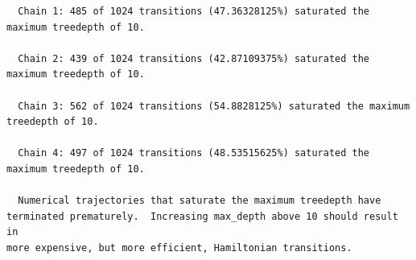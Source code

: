 \documentclass[
  letterpaper,
  DIV=11,
  numbers=noendperiod]{scrartcl}
\newenvironment{Shaded}{\begin{snugshade}}{\end{snugshade}}
\newcommand{\AttributeTok}[1]{\textcolor[rgb]{0.40,0.45,0.13}{#1}}
\newcommand{\ConstantTok}[1]{\textcolor[rgb]{0.56,0.35,0.01}{#1}}
\newcommand{\FunctionTok}[1]{\textcolor[rgb]{0.28,0.35,0.67}{#1}}
\newcommand{\NormalTok}[1]{\textcolor[rgb]{0.00,0.23,0.31}{#1}}
\newcommand{\OtherTok}[1]{\textcolor[rgb]{0.00,0.23,0.31}{#1}}
\newcommand{\SpecialCharTok}[1]{\textcolor[rgb]{0.37,0.37,0.37}{#1}}
\newcommand{\StringTok}[1]{\textcolor[rgb]{0.13,0.47,0.30}{#1}}
\begin{document}
\begin{verbatim}
  Chain 1: 485 of 1024 transitions (47.36328125%) saturated the maximum treedepth of 10.

  Chain 2: 439 of 1024 transitions (42.87109375%) saturated the maximum treedepth of 10.

  Chain 3: 562 of 1024 transitions (54.8828125%) saturated the maximum treedepth of 10.

  Chain 4: 497 of 1024 transitions (48.53515625%) saturated the maximum treedepth of 10.

  Numerical trajectories that saturate the maximum treedepth have
terminated prematurely.  Increasing max_depth above 10 should result in
more expensive, but more efficient, Hamiltonian transitions.
\end{verbatim}

\begin{Shaded}
\end{Shaded}
\end{document}
